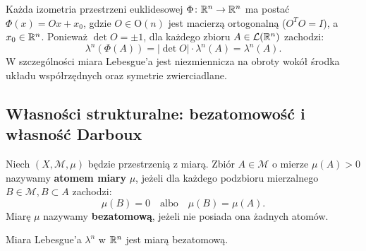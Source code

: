 \begin{wn}
    Każda izometria przestrzeni euklidesowej $\Phi \colon \mathbb{R}^{n} \to \mathbb{R}^{n}$ ma postać $\Phi(x) = Ox + x_0$, gdzie $O \in \mathrm{O}(n)$ jest macierzą ortogonalną ($O^T O = I$), a $x_0 \in \mathbb{R}^{n}$. Ponieważ $\det O = \pm 1$, dla każdego zbioru $A \in \mathcal{L}({\mathbb{R}^{n}})$ zachodzi:
    \begin{equation}
        \lambda^n(\Phi(A)) = |\det O| \cdot \lambda^n(A) = \lambda^n(A).
    \end{equation}
    W szczególności miara Lebesgue'a jest niezmiennicza na obroty wokół środka układu współrzędnych oraz symetrie zwierciadlane.
\end{wn}

\subsection{Własności strukturalne: bezatomowość i własność Darboux}

\begin{defi}
    Niech $(X, \mathcal{M}, \mu)$ będzie przestrzenią z miarą. Zbiór $A \in \mathcal{M}$ o mierze $\mu(A) > 0$ nazywamy \textbf{atomem miary} $\mu$, jeżeli dla każdego podzbioru mierzalnego $B \in \mathcal{M}, B \subset A$ zachodzi:
    \begin{equation}
        \mu(B) = 0 \quad \text{albo} \quad \mu(B) = \mu(A).
    \end{equation}
    Miarę $\mu$ nazywamy \textbf{bezatomową}, jeżeli nie posiada ona żadnych atomów.
\end{defi}

\begin{tw}
    Miara Lebesgue'a $\lambda^n$ w $\mathbb{R}^{n}$ jest miarą bezatomową.
\end{tw}

